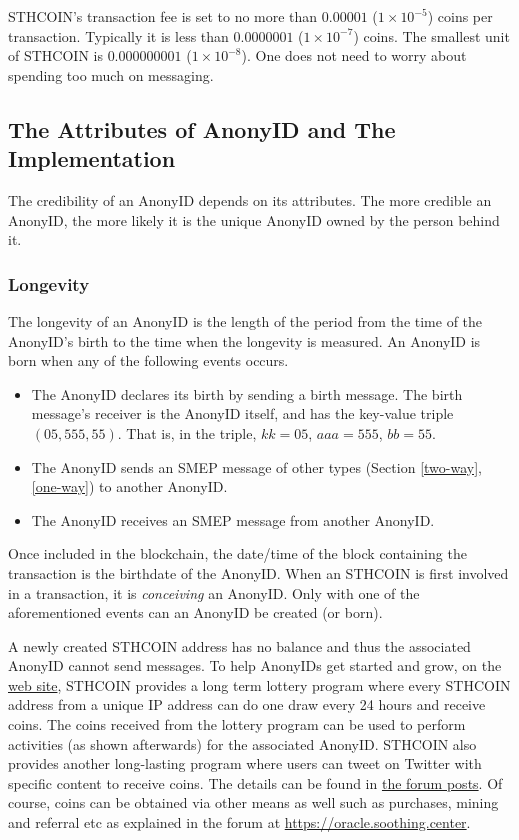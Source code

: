 \documentclass[12pt, a4paper]{article}
\begin{document}
STHCOIN's transaction fee is set to no more than $0.00001$ ($1 \times 10^{-5}$) coins per transaction. Typically it is less than $0.0000001$ ($1 \times 10^{-7}$) coins. The smallest unit of STHCOIN is $0.000000001$ ($1 \times 10^{-8}$). One does not need to worry about spending too much on messaging.

\subsection{The Attributes of AnonyID and The Implementation}

The credibility of an AnonyID depends on its attributes. The more credible an AnonyID, the more likely it is the unique AnonyID owned by the person behind it.

\subsubsection{Longevity}
\label{longevity}

The longevity of an AnonyID is the length of the period from the time of the AnonyID's birth to the time when the longevity is measured.
An AnonyID is born when any of the following events occurs.

\begin{itemize}
\item The AnonyID declares its birth by sending a birth message. The birth message's receiver is the AnonyID itself, and has the key-value triple $(05, 555, 55)$. That is, in the triple, $kk = 05$, $aaa = 555$, $bb = 55$.
\item The AnonyID sends an SMEP message of other types (Section \ref{two-way}, \ref{one-way}) to another AnonyID.
\item The AnonyID receives an SMEP message from another AnonyID.
\end{itemize}

Once included in the blockchain, the date/time of the block containing the transaction is the birthdate of the AnonyID. When an STHCOIN is first involved in a transaction, it is \textit{conceiving} an AnonyID. Only with one of the aforementioned events can an AnonyID be created (or born).

A newly created STHCOIN address has no balance and thus the associated AnonyID cannot send messages. To help AnonyIDs get started and grow, on the \href{https://soothing.center}{web site}, STHCOIN provides a long term lottery program where every STHCOIN address from a unique IP address can do one draw every 24 hours and receive coins. The coins received from the lottery program can be used to perform activities (as shown afterwards) for the associated AnonyID. STHCOIN also provides another long-lasting program where users can tweet on Twitter with specific content to receive coins. The details can be found in \href{https://oracle.soothing.center/t/twitter-rewards-beta-program/37}{the forum posts}. Of course, coins can be obtained via other means as well such as purchases, mining and referral etc as explained in the forum at \href{https://oracle.soothing.center}{https://oracle.soothing.center}.
\end{document}
